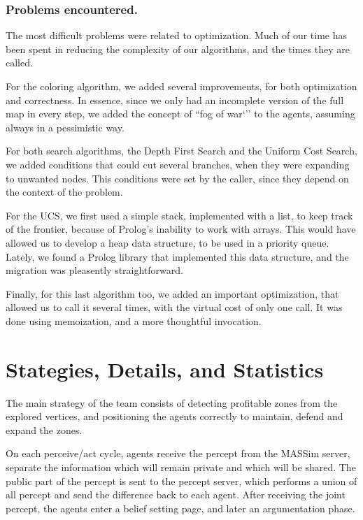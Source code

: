 \documentclass{llncs2e/llncs}
\begin{document}
\subsubsection{Problems encountered.}

    The most difficult problems were related to optimization. Much of our time has 
    been spent in reducing the complexity of our algorithms, and the times they 
    are called.

    For the coloring algorithm, we added several improvements, for both 
    optimization and correctness. In essence, since we only had an incomplete 
    version of the full map in every step, we added the concept of ``fog of war`'' 
    to the agents, assuming always in a pessimistic way. 

    For both search algorithms, the Depth First Search and the Uniform Cost 
    Search, we added conditions that could cut several branches, when they were 
    expanding to unwanted nodes. This conditions were set by the caller, since 
    they depend on the context of the problem.

    For the UCS, we first used a simple stack, implemented with a list, to keep 
    track of the frontier, because of Prolog's inability to work with arrays. This 
    would have allowed us to develop a heap data structure, to be used in a 
    priority queue. Lately, we found a Prolog library that implemented this data 
    structure, and the migration was pleasently straightforward.

    Finally, for this last algorithm too, we added an important optimization, 
    that allowed us to call it several times, with the virtual cost of only one 
    call. It was done using memoization, and a more thoughtful invocation.

\section{Stategies, Details, and Statistics}

    The main strategy of the team consists of detecting profitable zones from the 
    explored vertices, and positioning the agents correctly to maintain, defend 
    and expand the zones.

    On each perceive/act cycle, agents receive the percept from the MASSim server, 
    separate the information which will remain private and which will be shared. 
    The public part of the percept is sent to the percept server, which performs a 
    union of all percept and send the difference back to each agent. After 
    receiving the joint percept, the agents enter a belief setting page, and later 
    an argumentation phase.
\end{document}
